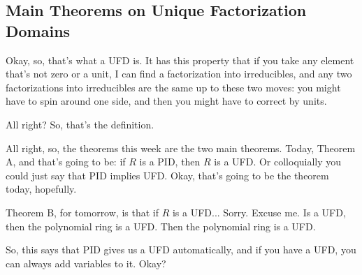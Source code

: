 \subsection{Main Theorems on Unique Factorization Domains}

\begin{speech}[00:16:20 - 00:17:25]
Okay, so, that's what a UFD is. It has this property that if you take any element that's not zero or a unit, I can find a factorization into irreducibles, and any two factorizations into irreducibles are the same up to these two moves: you might have to spin around one side, and then you might have to correct by units.

All right? So, that's the definition.

All right, so, the theorems this week are the two main theorems. Today, Theorem A,  and that's going to be: if $R$ is a PID,  then $R$ is a UFD.  Or colloquially you could just say that  PID implies UFD. Okay, that's going to be the theorem today, hopefully.

Theorem B, for tomorrow,  is that if $R$ is a UFD...  Sorry. Excuse me. Is a UFD, then the polynomial ring is a UFD.  Then the polynomial ring is a UFD.

So, this says that PID gives us a UFD automatically, and if you have a UFD, you can always add variables to it. Okay?
\end{speech}

